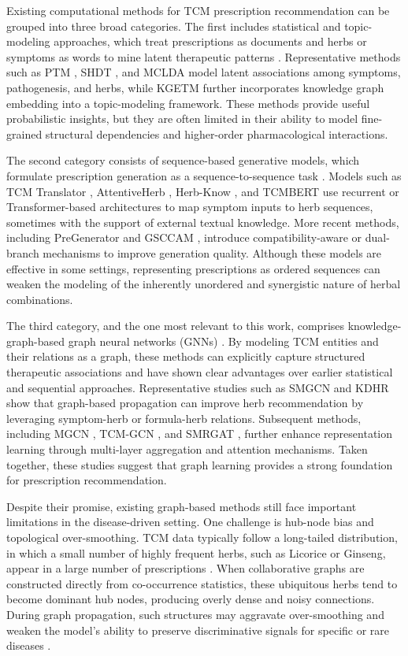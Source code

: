 \documentclass[a4paper,fleqn]{cas-dc}
\begin{document}
Existing computational methods for TCM prescription recommendation can be grouped into three broad categories. The first includes statistical and topic-modeling approaches, which treat prescriptions as documents and herbs or symptoms as words to mine latent therapeutic patterns \cite{ref21,ref22}. Representative methods such as PTM \cite{ref23}, SHDT \cite{ref24}, and MCLDA \cite{ref25} model latent associations among symptoms, pathogenesis, and herbs, while KGETM \cite{ref26} further incorporates knowledge graph embedding into a topic-modeling framework. These methods provide useful probabilistic insights, but they are often limited in their ability to model fine-grained structural dependencies and higher-order pharmacological interactions.

The second category consists of sequence-based generative models, which formulate prescription generation as a sequence-to-sequence task \cite{ref27,ref28}. Models such as TCM Translator \cite{ref29}, AttentiveHerb \cite{ref30}, Herb-Know \cite{ref31}, and TCMBERT \cite{ref32} use recurrent or Transformer-based architectures to map symptom inputs to herb sequences, sometimes with the support of external textual knowledge. More recent methods, including PreGenerator \cite{ref33} and GSCCAM \cite{ref34}, introduce compatibility-aware or dual-branch mechanisms to improve generation quality. Although these models are effective in some settings, representing prescriptions as ordered sequences can weaken the modeling of the inherently unordered and synergistic nature of herbal combinations.

The third category, and the one most relevant to this work, comprises knowledge-graph-based graph neural networks (GNNs) \cite{ref35,ref36}. By modeling TCM entities and their relations as a graph, these methods can explicitly capture structured therapeutic associations and have shown clear advantages over earlier statistical and sequential approaches. Representative studies such as SMGCN \cite{ref37} and KDHR \cite{ref38} show that graph-based propagation can improve herb recommendation by leveraging symptom-herb or formula-herb relations. Subsequent methods, including MGCN \cite{ref39}, TCM-GCN \cite{ref40}, and SMRGAT \cite{ref41}, further enhance representation learning through multi-layer aggregation and attention mechanisms. Taken together, these studies suggest that graph learning provides a strong foundation for prescription recommendation.

Despite their promise, existing graph-based methods still face important limitations in the disease-driven setting. One challenge is hub-node bias and topological over-smoothing. TCM data typically follow a long-tailed distribution, in which a small number of highly frequent herbs, such as Licorice or Ginseng, appear in a large number of prescriptions \cite{ref42}. When collaborative graphs are constructed directly from co-occurrence statistics, these ubiquitous herbs tend to become dominant hub nodes, producing overly dense and noisy connections. During graph propagation, such structures may aggravate over-smoothing and weaken the model’s ability to preserve discriminative signals for specific or rare diseases \cite{ref43,ref44}.
\end{document}
